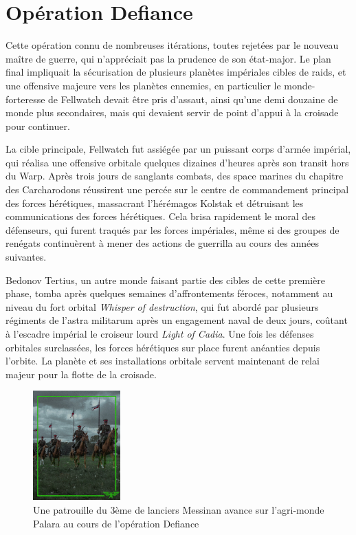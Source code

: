\documentclass[10pt,a4paper]{book}
\begin{document}
\section{Opération Defiance}
Cette opération connu de nombreuses itérations, toutes rejetées par le nouveau maître de guerre, qui n'appréciait pas la prudence de son état-major. Le plan final impliquait la sécurisation de plusieurs planètes impériales cibles de raids, et une offensive majeure vers les planètes ennemies, en particulier le monde-forteresse de Fellwatch devait être pris d'assaut, ainsi qu'une demi douzaine de monde plus secondaires, mais qui devaient servir de point d'appui à la croisade pour continuer.

La cible principale, Fellwatch fut assiégée par un puissant corps d'armée impérial, qui réalisa une offensive orbitale quelques dizaines d'heures après son transit hors du Warp. Après trois jours de sanglants combats, des space marines du chapitre des Carcharodons réussirent une percée sur le centre de commandement principal des forces hérétiques, massacrant l'hérémagos Kolstak et détruisant les communications des forces hérétiques. Cela brisa rapidement le moral des défenseurs, qui furent traqués par les forces impériales, même si des groupes de renégats continuèrent à mener des actions de guerrilla au cours des années suivantes.

Bedonov Tertius, un autre monde faisant partie des cibles de cette première phase, tomba après quelques semaines d'affrontements féroces, notamment au niveau du fort orbital \emph{Whisper of destruction}, qui fut abordé par plusieurs régiments de l'astra militarum après un engagement naval de deux jours, coûtant à l'escadre impérial le croiseur lourd \emph{Light of Cadia}. Une fois les défenses orbitales surclassées, les forces hérétiques sur place furent anéanties depuis l'orbite. La planète et ses installations orbitale servent maintenant de relai majeur pour la flotte de la croisade.

\begin{figure}
  \centering
  \includegraphics[width = 0.3\textwidth]{patrouille_cav.jpeg}
  \caption{Une patrouille du 3ème de lanciers Messinan avance sur l'agri-monde Palara au cours de l'opération Defiance}
\end{figure}
\end{document}
